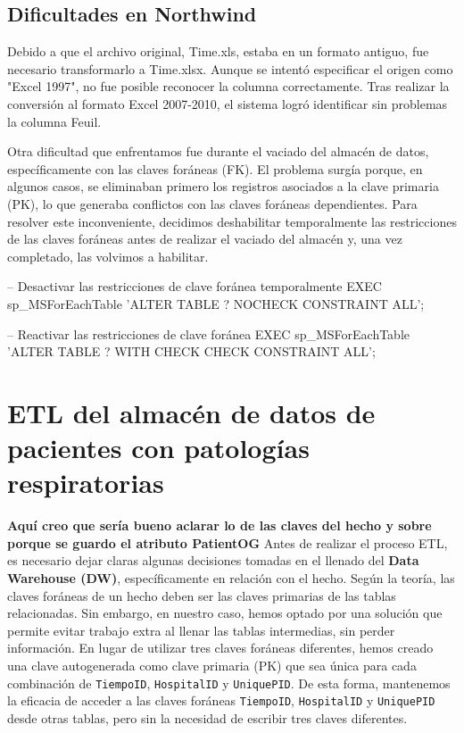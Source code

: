 \documentclass[12pt, a4paper, twoside]{article}
\begin{document}
	
	\subsection{Dificultades en Northwind}
	
	Debido a que el archivo original, Time.xls, estaba en un formato antiguo, fue necesario transformarlo a Time.xlsx. Aunque se intentó especificar el origen como "Excel 1997", no fue posible reconocer la columna correctamente. Tras realizar la conversión al formato Excel 2007-2010, el sistema logró identificar sin problemas la columna Feuil.
	
	Otra dificultad que enfrentamos fue durante el vaciado del almacén de datos, específicamente con las claves foráneas (FK). El problema surgía porque, en algunos casos, se eliminaban primero los registros asociados a la clave primaria (PK), lo que generaba conflictos con las claves foráneas dependientes. Para resolver este inconveniente, decidimos deshabilitar temporalmente las restricciones de las claves foráneas antes de realizar el vaciado del almacén y, una vez completado, las volvimos a habilitar.
	
	-- Desactivar las restricciones de clave foránea temporalmente
	EXEC sp\_MSForEachTable 'ALTER TABLE ? NOCHECK CONSTRAINT ALL';
	
	-- Reactivar las restricciones de clave foránea
	EXEC sp\_MSForEachTable 'ALTER TABLE ? WITH CHECK CHECK CONSTRAINT ALL';
	
	
	\section{ETL del almacén de datos de pacientes con patologías respiratorias}
	
	\textbf{Aquí creo que sería bueno aclarar lo de las claves del hecho y sobre porque se guardo el atributo PatientOG}
	Antes de realizar el proceso ETL, es necesario dejar claras algunas decisiones tomadas en el llenado del \textbf{Data Warehouse (DW)}, específicamente en relación con el hecho. Según la teoría, las claves foráneas de un hecho deben ser las claves primarias de las tablas relacionadas. Sin embargo, en nuestro caso, hemos optado por una solución que permite evitar trabajo extra al llenar las tablas intermedias, sin perder información. En lugar de utilizar tres claves foráneas diferentes, hemos creado una clave autogenerada como clave primaria (PK) que sea única para cada combinación de \texttt{TiempoID}, \texttt{HospitalID} y \texttt{UniquePID}. De esta forma, mantenemos la eficacia de acceder a las claves foráneas \texttt{TiempoID}, \texttt{HospitalID} y \texttt{UniquePID} desde otras tablas, pero sin la necesidad de escribir tres claves diferentes.
	
\end{document}
